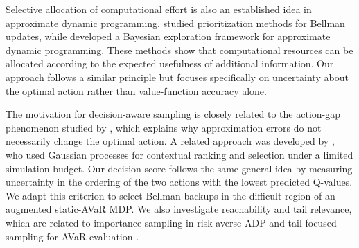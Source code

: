 Selective allocation of computational effort is also an established idea in approximate dynamic programming. \cite{wingate-2005} studied prioritization methods for Bellman updates, while \cite{ryzhov-2019} developed a Bayesian exploration framework for approximate dynamic programming. These methods show that computational resources can be allocated according to the expected usefulness of additional information. Our approach follows a similar principle but focuses specifically on uncertainty about the optimal action rather than value-function accuracy alone.

The motivation for decision-aware sampling is closely related to the action-gap phenomenon studied by \cite{farahmand-2011}, which explains why approximation errors do not necessarily change the optimal action. A related approach was developed by \cite{cakmak-2024}, who used Gaussian processes for contextual ranking and selection under a limited simulation budget. Our decision score follows the same general idea by measuring uncertainty in the ordering of the two actions with the lowest predicted Q-values. We adapt this criterion to select Bellman backups in the difficult region of an augmented static-AVaR MDP. We also investigate reachability and tail relevance, which are related to importance sampling in risk-averse ADP \citep{jiang-2018} and tail-focused sampling for AVaR evaluation \citep{bourigault-2026}.